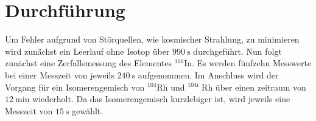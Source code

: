 
\section{Durchführung}
\label{sec:Durchführung}
Um Fehler aufgrund von Störquellen, wie kosmischer Strahlung, zu minimieren wird zunächst ein Leerlauf ohne Isotop über $\SI{990}{\second}$ durchgeführt. Nun folgt zunächst eine Zerfallsmessung des Elementes $^{116}$In. Es werden fünfzehn Messwerte bei
 einer Messzeit von jeweils $\SI{240}{\second}$ aufgenommen. Im Anschluss wird der Vorgang für ein Isomerengemisch von $^{104}$Rh und $^{104\text{i}}$ Rh über einen zeitraum von $\SI{12}{\minute}$ wiederholt. Da das Isomerengemisch kurzlebiger ist, wird jeweils eine Messzeit von $\SI{15}{\second}$ gewählt.
